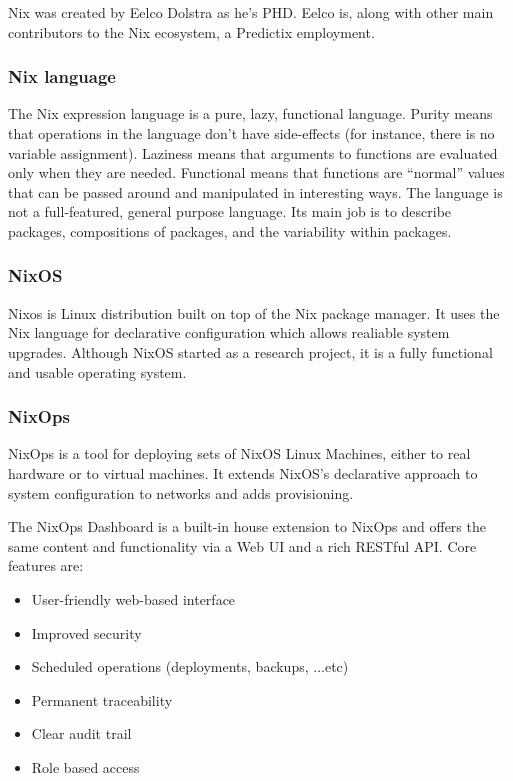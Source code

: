 Nix was created by Eelco Dolstra as he's PHD. Eelco is, along with other main
contributors to the Nix ecosystem, a Predictix employment.
\subsubsection{Nix language}
The Nix expression language is a pure, lazy, functional language. Purity means
that operations in the language don't have side-effects (for instance, there is
no variable assignment). Laziness means that arguments to functions are
evaluated only when they are needed. Functional means that functions are
“normal” values that can be passed around and manipulated in interesting ways.
The language is not a full-featured, general purpose language. Its main job is
to describe packages, compositions of packages, and the variability within
packages.

\subsubsection{NixOS}
Nixos is Linux distribution built on top of the Nix package manager. It
uses the Nix language for declarative configuration which allows realiable
system upgrades.
Although NixOS started as a research project, it is a fully functional and
usable operating system.

\subsubsection{NixOps}
NixOps is a tool for deploying sets of NixOS Linux Machines, either to real
hardware or to virtual machines. It extends NixOS's declarative approach to
system configuration to networks and adds provisioning.

\par
The NixOps Dashboard is a built-in house extension to NixOps and offers the same
content and functionality via a Web UI and a rich RESTful API. Core features
are:

\begin{itemize}
\item User-friendly web-based interface
\item Improved security
\item Scheduled operations (deployments, backups, ...etc)
\item Permanent traceability
\item Clear audit trail
\item Role based access
\end{itemize}

